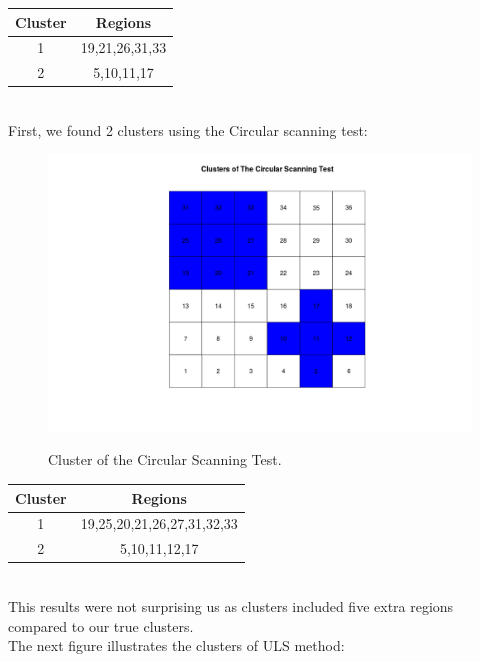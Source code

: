 \documentclass[12pt]{article}
\begin{document}
\hspace{4cm}\begin{tabular}{|c|c|}
	\hline
	Cluster & Regions \\
	\hline
	1 & 19,21,26,31,33 \\
	2 & 5,10,11,17 \\ \hline
\end{tabular} \\

First, we found 2 clusters using the Circular scanning test:\\


\begin{figure}[!ht]
	
	\centering
	\includegraphics[scale=0.4]{Ex2_Circular}\\
	\caption{Cluster of the Circular Scanning Test.\label{f:gull}}
	
\end{figure}

\hspace{4cm}\begin{tabular}{|c|c|}
	\hline
	Cluster & Regions \\
	\hline
	1 & 19,25,20,21,26,27,31,32,33 \\
	2 & 5,10,11,12,17 \\ 
	 \hline
\end{tabular} \\

This results were not surprising us as clusters included five extra regions compared to our true clusters.\\

The next figure illustrates the clusters of ULS method: \\ 
\end{document}

